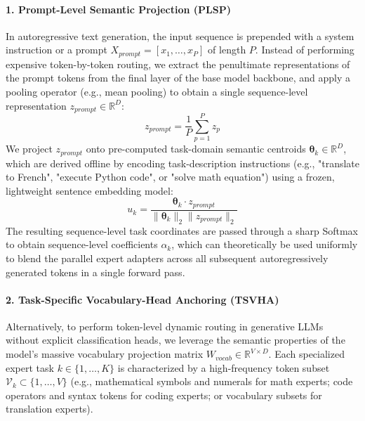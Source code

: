 \paragraph{1. Prompt-Level Semantic Projection (PLSP)}
In autoregressive text generation, the input sequence is prepended with a system instruction or a prompt $X_{prompt} = [x_1, \dots, x_P]$ of length $P$. Instead of performing expensive token-by-token routing, we extract the penultimate representations of the prompt tokens from the final layer of the base model backbone, and apply a pooling operator (e.g., mean pooling) to obtain a single sequence-level representation $z_{prompt} \in \mathbb{R}^D$:
\begin{equation}
  z_{prompt} = \frac{1}{P} \sum_{p=1}^P z_p
\end{equation}
We project $z_{prompt}$ onto pre-computed task-domain semantic centroids $\boldsymbol{\theta}_k \in \mathbb{R}^D$, which are derived offline by encoding task-description instructions (e.g., "translate to French", "execute Python code", or "solve math equation") using a frozen, lightweight sentence embedding model:
\begin{equation}
  u_k = \frac{\boldsymbol{\theta}_k \cdot z_{prompt}}{\|\boldsymbol{\theta}_k\|_2 \|z_{prompt}\|_2}
\end{equation}
The resulting sequence-level task coordinates are passed through a sharp Softmax to obtain sequence-level coefficients $\alpha_k$, which can theoretically be used uniformly to blend the parallel expert adapters across all subsequent autoregressively generated tokens in a single forward pass.

\paragraph{2. Task-Specific Vocabulary-Head Anchoring (TSVHA)}
Alternatively, to perform token-level dynamic routing in generative LLMs without explicit classification heads, we leverage the semantic properties of the model's massive vocabulary projection matrix $W_{vocab} \in \mathbb{R}^{V \times D}$. Each specialized expert task $k \in \{1, \dots, K\}$ is characterized by a high-frequency token subset $\mathcal{V}_k \subset \{1, \dots, V\}$ (e.g., mathematical symbols and numerals for math experts; code operators and syntax tokens for coding experts; or vocabulary subsets for translation experts). 


